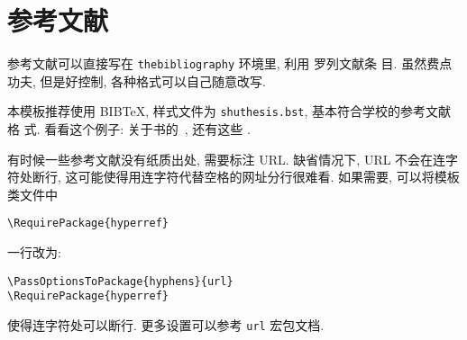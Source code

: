 \chapter{参考文献}
\label{cha:bib}
参考文献可以直接写在 \texttt{thebibliography} 环境里, 利用  罗列文献条
目. 虽然费点功夫, 但是好控制, 各种格式可以自己随意改写.

本模板推荐使用 BIB\TeX, 样式文件为 \texttt{shuthesis.bst}, 基本符合学校的参考文献格
式. 看看这个例子: 关于书的~\cite{tex1989,algebra2000}, 还有这些 \cite{nikiforov2014,
BuFanZhou2016:Z-eigenvalues,HuQiShao2013:Cored-Hypergraphs,KangNikiforov2014:Extremal-Problems,
LinZhou2016:Distance-Spectral,LuMan2016:Small-Spectral-Radius,Nikiforov2017:Symmetric-Spectrum,
Qi2014:H-Plus-Eigenvalues}.

有时候一些参考文献没有纸质出处, 需要标注 URL. 缺省情况下, URL 不会在连字符处断行,
这可能使得用连字符代替空格的网址分行很难看. 如果需要, 可以将模板类文件中
\begin{verbatim}
\RequirePackage{hyperref}
\end{verbatim}
一行改为:
\begin{verbatim}
\PassOptionsToPackage{hyphens}{url}
\RequirePackage{hyperref}
\end{verbatim}
使得连字符处可以断行. 更多设置可以参考 \texttt{url} 宏包文档.